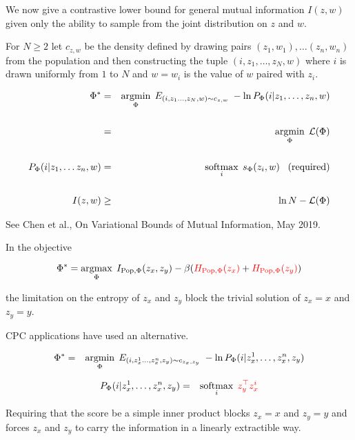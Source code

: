 {We now give a contrastive lower bound for general mutual information $I(z,w)$ given only the ability to sample from the joint distribution on $z$ and $w$.

\vfill
For $N \geq 2$ let {\color{red} $c_{z,w}$} be the density defined by drawing pairs $(z_1,w_1), \ldots (z_n,w_n)$ from the population
and then constructing the tuple $(i,z_1,\ldots,z_N,w)$ where $i$ is drawn uniformly from $1$ to $N$ and $w = w_i$ is the value of $w$ paired with $z_i$.


{\huge
\begin{eqnarray*}
\Phi^* & = & \operatorname*{argmin}_\Phi \;E_{(i,z_1\ldots,z_N,w) \sim c_{z,w}}\;-\ln P_\Phi(i|z_1,\ldots,z_n,w) \\
\\
& = & \operatorname*{argmin}_\Phi\;{\cal L}(\Phi) \\
\\
P_\Phi(i|z_1,\ldots z_n,w) & = & \operatorname*{softmax}_i\;s_\Phi(z_i,w) \;\;\;\mbox{(required)} \\
\\
I(z,w) & \geq & \ln N - {\cal L}(\Phi)
\end{eqnarray*}
}

See Chen et al., On Variational Bounds of Mutual Information, May 2019.


In the objective

$$\Phi^* = \operatorname*{argmax}_{\Phi} \; I_{\mathrm{Pop},\Phi}(z_x,z_y) - \beta ({\color{red} H_{\mathrm{Pop},\Phi}(z_x)} + {\color{red} H_{\mathrm{Pop},\Phi}(z_y)})$$


the limitation on the entropy of $z_x$ and $z_y$ block the trivial solution of $z_x = x$ and $z_y = y$.


\vfill
CPC applications have used an alternative.


\begin{eqnarray*}
\Phi^* & = & \operatorname*{argmin}_\Phi \;E_{(i,z_x^1\ldots,z_x^n,z_y) \sim c_{z_x,z_y}}\;-\ln P_\Phi(i|z_x^1,\ldots,z_x^n,z_y)
\end{eqnarray*}

\begin{eqnarray*}
P_\Phi(i|z_x^1,\ldots,z_x^n,z_y) & = & \operatorname*{softmax}_i\;{\color{red} z_y^\top z_x^i}
\end{eqnarray*}


\vfill
Requiring that the score be a simple inner product blocks $z_x = x$ and $z_y = y$ and forces
$z_x$ and $z_y$ to carry the information in a linearly extractible way.

}
